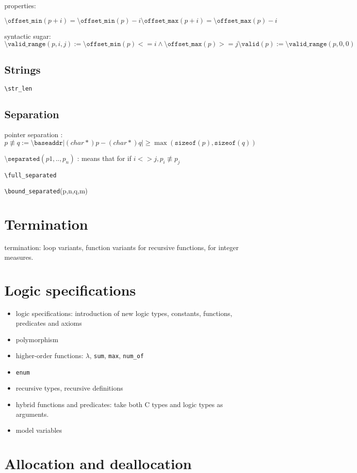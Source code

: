\documentclass{article}
\newcommand{\baseaddr}{\texttt{{\textbackslash}baseaddr}}
\newcommand{\boundseparated}{\texttt{{\textbackslash}bound\_separated}}
\newcommand{\fullseparated}{\texttt{{\textbackslash}full\_separated}}
\newcommand{\Max}{\texttt{max}}
\newcommand{\numof}{\texttt{num\_of}}
\newcommand{\offsetmin}{\texttt{{\textbackslash}offset\_min}}
\newcommand{\offsetmax}{\texttt{{\textbackslash}offset\_max}}
\newcommand{\separated}{\texttt{{\textbackslash}separated}}
\newcommand{\sizeof}{\texttt{sizeof}}
\newcommand{\strlen}{\texttt{{\textbackslash}str\_len}}
\newcommand{\Sum}{\texttt{sum}}
\newcommand{\valid}{\texttt{{\textbackslash}valid}}
\newcommand{\validrange}{\texttt{{\textbackslash}valid\_range}}
\begin{document}
properties:

\[
\offsetmin(p+i) = \offsetmin(p)-i
\offsetmax(p+i) = \offsetmax(p)-i
\]

syntactic sugar:
\[
\validrange(p,i,j) := \offsetmin(p) <= i \land \offsetmax(p) >= j
\valid(p) := \validrange(p,0,0)
\]

\subsection{Strings}

\strlen

\subsection{Separation}

pointer separation :
\[
p \not\equiv q := \baseaddr |(char*)p - (char*)q| \geq \max(\sizeof(p),\sizeof(q))
\]

$\separated(p1,..,p_n)$ : means that for if $i<>j, p_i \not\equiv p_j$

\fullseparated

\boundseparated(p,n,q,m)

\section{Termination}

termination: loop variants, function variants for recursive
  functions, for integer measures.

\section{Logic specifications}

\begin{itemize}
\item logic specifications: introduction of new logic types,
  constants, functions, predicates and axioms
\item polymorphism
\item higher-order functions: $\lambda$, \Sum, \Max, \numof
\item {\tt enum}
\item recursive types, recursive definitions
\item hybrid functions and predicates: take both C types and logic
  types as arguments.
\item model variables
\end{itemize}

\section{Allocation and deallocation}
\end{document}
